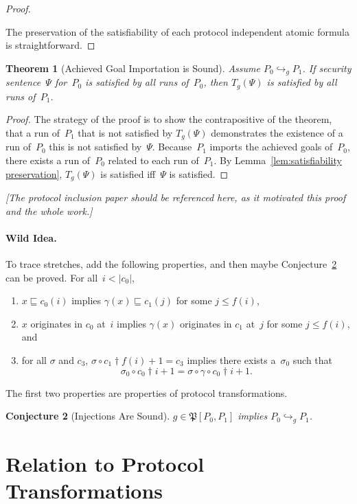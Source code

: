 \documentclass[12pt]{article}
\newcommand{\remark}[1]{\emph{[#1]}}
\newtheorem{thm}{Theorem}
\newtheorem{conj}[thm]{Conjecture}
\newcommand{\prefix}[2]{#1\dagger#2}
\newcommand{\alg}[1]{\ensuremath{\mathfrak{#1}}}
\begin{document}
\begin{proof}
\begin{itemize}
\end{itemize}

The preservation of the satisfiability of each protocol independent
atomic formula is straightforward.
\end{proof}

\begin{thm}[Achieved Goal Importation is Sound]
Assume $P_0\hookrightarrow_g P_1$.  If security sentence~$\Psi$
for~$P_0$ is satisfied by all runs of~$P_0$, then $T_g(\Psi)$ is
satisfied by all runs of~$P_1$.
\end{thm}

\begin{proof}
The strategy of the proof is to show the contrapositive of the
theorem, that a run of~$P_1$ that is not satisfied by $T_g(\Psi)$
demonstrates the existence of a run of~$P_0$ this is not satisfied
by~$\Psi$.  Because~$P_1$ imports the achieved goals of~$P_0$, there
exists a run of~$P_0$ related to each run of~$P_1$.  By
Lemma~\ref{lem:satisfiability preservation}, $T_g(\Psi)$ is satisfied
iff~$\Psi$ is satisfied.
\end{proof}

\remark{The protocol inclusion paper should be referenced
  here, as it motivated this proof and the whole work.}

\paragraph{Wild Idea.}
To trace stretches, add the following properties, and then maybe
Conjecture~\ref{conj: injections are sound} can be proved.
For all~$i<|c_0|$, 
\begin{enumerate}
\item $x\sqsubseteq c_0(i)$ implies $\gamma(x)\sqsubseteq
  c_1(j)$ for some $j\leq f(i)$,
\item $x$ originates in $c_0$ at~$i$ implies $\gamma(x)$ originates in
  $c_1$ at~$j$ for some $j\leq f(i)$, and
\item for all $\sigma$ and $c_3$, $\sigma\circ\prefix{c_1}{f(i)+1}=c_3$
  implies there exists a~$\sigma_0$ such that
  \[\sigma_0\circ\prefix{c_0}{i+1}=
  \sigma\circ\gamma\circ\prefix{c_0}{i+1}.\]
\end{enumerate}
The first two properties are properties of protocol transformations.

\begin{conj}[Injections Are Sound]\label{conj: injections are sound}
  $g\in\alg{P}[P_0,P_1]$ implies $P_0\hookrightarrow_g P_1$.
\end{conj}

\section{Relation to Protocol Transformations}
\label{sec:protocol transformations}



\end{document}
